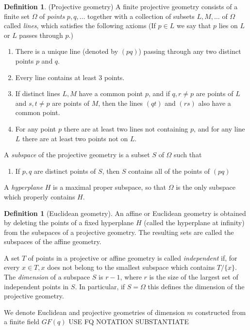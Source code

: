 \documentclass[12pt,twoside]{reedthesis}
\theoremstyle{definition}
\newtheorem{definition}[theorem]{Definition}
\begin{document}
\begin{definition}(Projective geometry) A finite projective geometry consists of a finite set $\Omega$ of \textit{points} $p, q, \ldots$ together with a collection of subsets $L, M, \ldots$ of $\Omega$ called \textit{lines}, which satisfies the following axioms (If $p \in L$ we say that $p$ lies on $L$ or $L$ passes through $p$.)
\begin{enumerate}
\item There is a unique line (denoted by $(pq)$) passing through any two distinct points $p$ and $q$.
\item Every line contains at least 3 points.
\item If distinct lines $L, M$ have a common point $p$, and if $q,  r\neq p$ are points of $L$ and $s, t\neq p$ are points of $M$, then the lines $(qt)$ and $(rs)$ also have a common point.
\item For any point $p$ there are at least two lines not containing $p$, and for any line $L$ there are at least two points not on $L$.
\end{enumerate}
A \textit{subspace} of the projective geometry is a subset $S$ of $\Omega$ such that
\begin{enumerate}[resume]
\item If $p,q$ are distinct points of $S$, then $S$ contains all of the points of $(pq)$
\end{enumerate}
A \textit{hyperplane} $H$ is a maximal proper subspace, so that $\Omega$ is the only subspace which properly contains $H$.
\end{definition}

\begin{definition}[Euclidean geometry] An affine or Euclidean geometry is obtained by deleting the points of a fixed hyperplane $H$ (called the hyperplane at infinity) from the subspaces of a projective geometry. The resulting sets are called the subspaces of the affine geometry.

A set $T$ of points in a projective or affine geometry is called \textit{independent} if, for every $x \in T, x$ does not belong to the smallest subspace which contains $T/\{x\}$. The \textit{dimension} of a subspace $S$ is $r-1$, where $r$ is the size of the largest set of independent points in $S$. In particular, if $S = \Omega$ this defines the dimension of the projective geometry.
\end{definition}

We denote Euclidean and projective geometries of dimension $m$ constructed from a finite field $GF(q)$
USE FQ NOTATION
SUBSTANTIATE 
\end{document}
